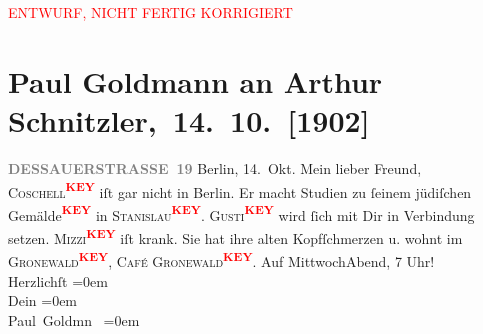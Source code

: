 
\begin{center}
            \textcolor{red}{ENTWURF, NICHT FERTIG KORRIGIERT}
                      \end{center}
            
         \renewcommand{\erwaehnteOrte}{Orte: Berlin, Dessauer Straße}
         \renewcommand{\erwaehnteWerke}{}
               \section[ Paul Goldmann an Arthur Schnitzler, 14. 10. {[}1902{]}]{ Paul Goldmann an Arthur Schnitzler, 14. 10. {[}1902{]}}\nopagebreak{}\rehead{ }\begin{ledgroupsized}[t]{13cm}\normalsize\beginnumbering \toendnotes[C]{\smallbreak\pagebreak[2]} 
\pstart
           \noindent{}\raggedleft{}{\pb}\textcolor{gray}{\textbf{DESSAUERSTRASSE 19}}\pend
           \pstart
           Berlin, 14. Okt.\pend
           \pstart\center{}Mein lieber Freund,\pend\pstart
           \textsc{Coschell\textcolor{red}{\textsuperscript{\textbf{KEY}}}} iſt gar nicht in Berlin. Er macht
                    Studien zu ſeinem jüdiſchen Gemälde\textcolor{red}{\textsuperscript{\textbf{KEY}}} in \textsc{Stanislau\textcolor{red}{\textsuperscript{\textbf{KEY}}}}. \pend
           \pstart
           \textsc{Gusti\textcolor{red}{\textsuperscript{\textbf{KEY}}}} wird ſich mit Dir in Verbindung setzen. \pend
           \pstart
           \textsc{Mizzi\textcolor{red}{\textsuperscript{\textbf{KEY}}}} iſt krank. Sie {\pb} hat ihre alten
                    Kopfſchmerzen u. wohnt im \textsc{Gronewald\textcolor{red}{\textsuperscript{\textbf{KEY}}}}, \textsc{Café Gronewald\textcolor{red}{\textsuperscript{\textbf{KEY}}}}. \pend
           \pstart
           Auf MittwochAbend, 7 Uhr! {\\[\baselineskip]}Herzlichſt\pend
           \leftskip=0em{}\pstart
           {\\[\baselineskip]}Dein\pend
           \leftskip=0em{}\pstart
           {\\[\baselineskip]}\spacefill\mbox{Paul Goldmn }\pend
           \leftskip=0em{}
         
         \endnumbering{}\end{ledgroupsized}\begin{anhang}\end{anhang}\newcommand{\dateiname}{L03227}\newcommand{\titel}{Paul Goldmann an Arthur Schnitzler, 14. 10. [1902]}\newcommand{\editorInnen}{Martin Anton Müller und Laura Untner}
      